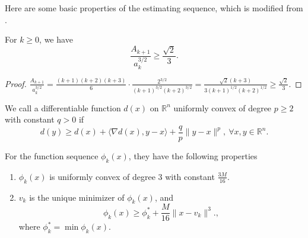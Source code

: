 \documentclass{article}
\begin{document}
Here are some basic properties of the estimating sequence, which is modified from \citet{nesterov_lectures_2018}.
\begin{lemma}
    \label{lem.magnitude a and A}
    For $k\geq 0$, we have
    \begin{equation}
        \label{eq.magnitude a and A}
        \frac{A_{k+1}}{a_k^{3/2}} \geq \frac{\sqrt{2}}{3}.
    \end{equation}
\end{lemma}
\begin{proof}
    $\frac{A_{k+1}}{a_k^{3/2}}= \frac{(k+1)(k+2)(k+3)}{6}\cdot \frac{2^{3/2}}{(k+1)^{3/2}(k+2)^{3/2}} = \frac{\sqrt{2}(k+3)}{3(k+1)^{1/2}(k+2)^{1/2}} \geq \frac{\sqrt{2}}{3}.$
\end{proof}
We call a differentiable function $d(x)$ on $\mathbb{R}^n$ uniformly convex \citet[Section 4.2.2]{nesterov_lectures_2018} of degree $p\geq 2$ with constant $q>0$ if
\begin{equation}
    \label{eq.uniformly convex of p}
    d(y)\geq d(x)+\langle \nabla d(x),y-x\rangle +\frac{q}{p}\|y-x\|^p, \ \forall x,y\in\mathbb{R}^n.
\end{equation}
\begin{lemma}
    \label{lem.property of phi}
    For the function sequence $\phi_k(x)$, they have the following properties
    \begin{enumerate}
        \item $\phi_k(x)$ is uniformly convex of degree $3$ with constant $\frac{3M}{16}$.
        \item $v_k$ is the unique minimizer of $\phi_k(x)$, and 
        \begin{equation}
            \label{eq.phi_k phi_low}
            \phi_k(x)\geq \phi_k^* + \frac{M}{16}\|x-v_k\|^3.,
        \end{equation}
        where $\phi_k^* =\min \phi_k(x).$
    \end{enumerate}
\end{lemma}
\end{document}
